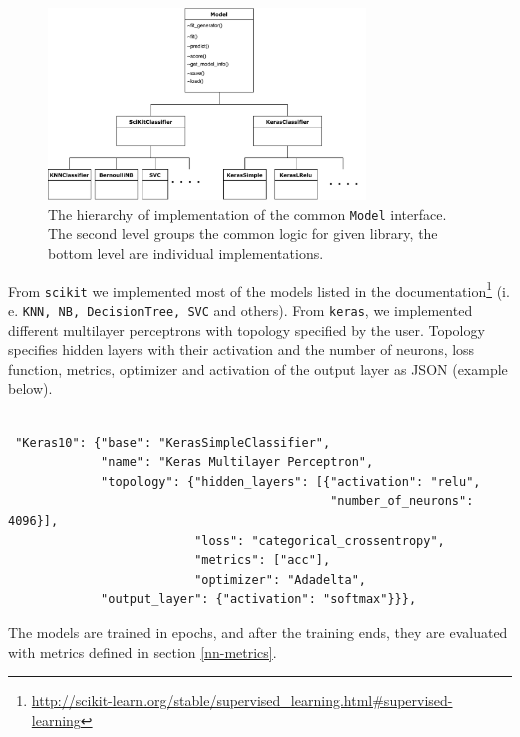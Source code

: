 \begin{figure}[H]

\centering
\includegraphics[width=0.75\textwidth]{tex/images/model_inheritance}
\caption{The hierarchy of implementation of the common \texttt{Model} interface. The second level groups the common logic for given library, the bottom level are individual implementations.}
\label{model-inheritance}

\end{figure}

From \texttt{scikit} we implemented most of the models listed in the documentation\footnote{\url{http://scikit-learn.org/stable/supervised\_learning.html\#supervised-learning}} (i. e. \texttt{KNN, NB, DecisionTree, SVC} and others). From \texttt{keras}, we implemented different multilayer perceptrons with topology specified by the user. Topology specifies hidden layers with their activation and the number of neurons, loss function, metrics, optimizer and activation of the output layer as JSON (example below).

\label{models-json}
\begin{verbatim}

 "Keras10": {"base": "KerasSimpleClassifier",
             "name": "Keras Multilayer Perceptron",
             "topology": {"hidden_layers": [{"activation": "relu",
                                             "number_of_neurons": 4096}],
                          "loss": "categorical_crossentropy",
                          "metrics": ["acc"],
                          "optimizer": "Adadelta",
             "output_layer": {"activation": "softmax"}}},

\end{verbatim}

\noindent
The models are trained in epochs, and after the training ends, they are evaluated with metrics defined in section \ref{nn-metrics}.

